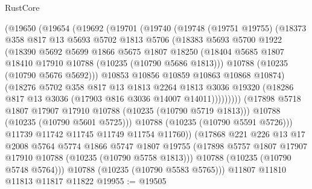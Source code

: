 \begin{lexlean}{RustCore}
\begin{coremodule}
            (@19650
              (@19654
                (@19692
                  (@19701
                    (@19740
                      (@19748
                        (@19751 @19755)
                        (@18373
                          @358
                          @817
                          @13
                          @5693
                          @5702
                          @1813
                          @5706
                          (@18383
                            @5693
                            @5700
                            @1922
                            (@18390
                              @5692
                              @5699
                              @1866
                              @5675
                              @1807
                              @18250
                              (@18404
                                @5685
                                @1807
                                @18410
                                @17910
                                @10788
                                (@10235 (@10790 @5686 @1813)))
                              @10788
                              (@10235 (@10790 @5676 @5692)))
                            @10853
                            @10856
                            @10859
                            @10863
                            @10868
                            @10874)
                          (@18276
                            @5702
                            @358
                            @817
                            @13
                            @1813
                            @2264
                            @1813
                            @3036
                            @19320
                            (@18286 @817 @13 @3036 (@17903 @816 @3036 @14007 @14011)))))))))
              (@17898 @5718 @1807 @17907 @17910 @10788 (@10235 (@10790 @5719 @1813)))
              @10788
              (@10235 (@10790 @5601 @5725)))
            @10788
            (@10235 (@10790 @5591 @5726)))
          @11739
          @11742
          @11745
          @11749
          @11754
          @11760))
      (@17868
        @221
        @226
        @13
        @17
        @2008
        @5764
        @5774
        @1866
        @5747
        @1807
        @19755
        (@17898 @5757 @1807 @17907 @17910 @10788 (@10235 (@10790 @5758 @1813)))
        @10788
        (@10235 (@10790 @5748 @5764)))
      @10788
      (@10235 (@10790 @5583 @5765)))
    @11807
    @11810
    @11813
    @11817
    @11822
@19955 := @19505

\end{coremodule}
\end{lexlean}
